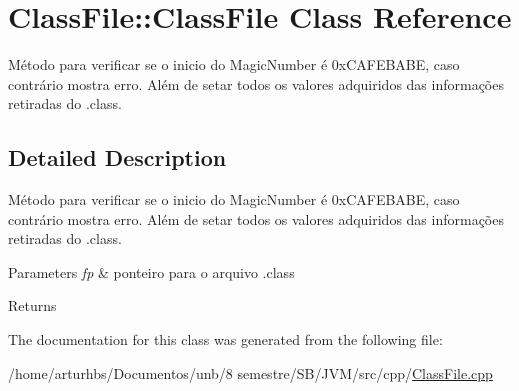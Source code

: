 \hypertarget{classClassFile_1_1ClassFile}{}\section{Class\+File\+:\+:Class\+File Class Reference}
\label{classClassFile_1_1ClassFile}


Método para verificar se o inicio do Magic\+Number é 0x\+C\+A\+F\+E\+B\+A\+BE, caso contrário mostra erro. Além de setar todos os valores adquiridos das informações retiradas do .class.  




\subsection{Detailed Description}
Método para verificar se o inicio do Magic\+Number é 0x\+C\+A\+F\+E\+B\+A\+BE, caso contrário mostra erro. Além de setar todos os valores adquiridos das informações retiradas do .class. 


\begin{DoxyParams}{Parameters}
{\em fp} & ponteiro para o arquivo .class \\
\hline
\end{DoxyParams}
\begin{DoxyReturn}{Returns}

\end{DoxyReturn}


The documentation for this class was generated from the following file\+:\begin{DoxyCompactItemize}
\item 
/home/arturhbs/\+Documentos/unb/8 semestre/\+S\+B/\+J\+V\+M/src/cpp/\hyperlink{ClassFile_8cpp}{Class\+File.\+cpp}\end{DoxyCompactItemize}
